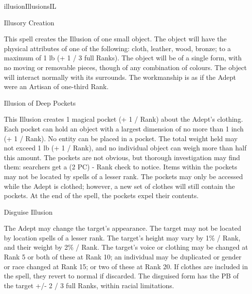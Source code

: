 \begin{college}[1.4]{illusion}{Illusions}{IL}
\begin{spell}[S-3]{Illusory Creation}

\begin{effects}
This spell creates the Illusion of one small object. The object will
have the physical attributes of one of the following: cloth, leather,
wood, bronze; to a maximum of 1 lb (+ 1 / 3 full Ranks). The object
will be of a single form, with no moving or removable pieces, though
of any combination of colours. The object will interact normally with
its surrounds. The workmanship is as if the Adept were an Artisan of
one-third Rank.
\end{effects}
\end{spell}

\begin{spell}[S-4]{Illusion of Deep Pockets}

\begin{effects}
This Illusion creates 1 magical pocket (+ 1 / Rank) about the Adept's
clothing. Each pocket can hold an object with a largest dimension of
no more than 1 inch (+ 1 / Rank). No entity can be placed in a pocket.
The total weight held may not exceed 1 lb (+ 1 / Rank), and no
individual object can weigh more than half this amount. The pockets
are not obvious, but thorough investigation may find them: searchers
get a (2 \x PC) - Rank check to notice. Items within the pockets may
not be located by spells of a lesser rank. The pockets may only be
accessed while the Adept is clothed; however, a new set of clothes
will still contain the pockets. At the end of the spell, the pockets
expel their contents.
\end{effects}
\end{spell}

\begin{spell}[S-5]{Disguise Illusion}

\begin{effects}
The Adept may change the target's appearance. The target may not be
located by location spells of a lesser rank. The target's height may
vary by 1\% / Rank, and their weight by 2\% / Rank. The target's voice
or clothing may be changed at Rank 5 or both of these at Rank 10; an
individual may be duplicated or gender or race changed at Rank 15; or
two of these at Rank 20. If clothes are included in the spell, they
revert to normal if discarded. The disguised form has the PB of the
target +/- 2 / 3 full Ranks, within racial limitations.
\end{effects}
\end{spell}


\end{college}
